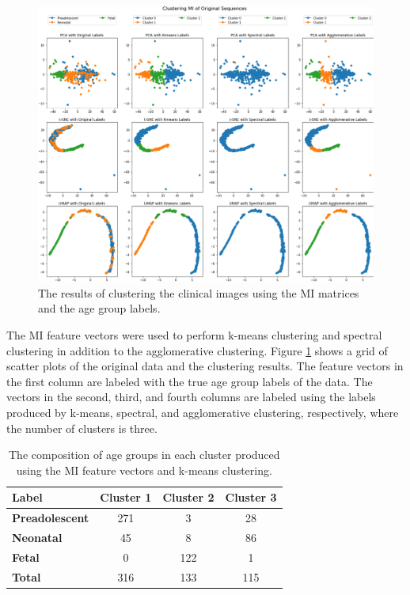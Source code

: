 \begin{figure}
\centering
\includegraphics[width=1.0\textwidth]{6/figures/bold-mi-agegroup.png}
\caption{The results of clustering the clinical images using the MI matrices and the age group labels.}
\label{fig:mocha-ages-mi-bold}
\end{figure}

The MI feature vectors were used to perform k-means clustering and spectral clustering in addition to the agglomerative clustering. Figure \ref{fig:mocha-ages-mi-bold} shows a grid of scatter plots of the original data and the clustering results. The feature vectors in the first column are labeled with the true age group labels of the data. The vectors in the second, third, and fourth columns are labeled using the labels produced by k-means, spectral, and agglomerative clustering, respectively, where the number of clusters is three. 

\begin{table}[]
\centering
\caption{The composition of age groups in each cluster produced using the MI feature vectors and k-means clustering.}
\label{tab:mocha-mi-kmeans}
\begin{tabular}{|l|c|c|c|}
\hline
\textbf{Label} & \multicolumn{1}{l|}{\textbf{Cluster 1}} & \multicolumn{1}{l|}{\textbf{Cluster 2}} & \multicolumn{1}{l|}{\textbf{Cluster 3}} \\ \hline
\textbf{Preadolescent} & 271 & 3   & 28  \\ \hline
\textbf{Neonatal}      & 45  & 8   & 86  \\ \hline
\textbf{Fetal}         & 0   & 122 & 1   \\ \hline
\textbf{Total}         & 316 & 133 & 115 \\ \hline
\end{tabular}
\end{table}

